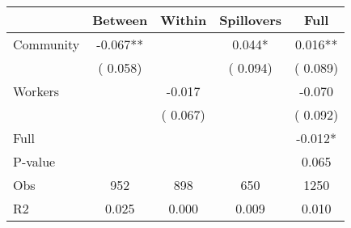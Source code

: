 
\begin{tabular}{l*{4}{c}}\hline&\multicolumn{1}{c}{Between}&\multicolumn{1}{c}{Within}&\multicolumn{1}{c}{Spillovers}&\multicolumn{1}{c}{Full}\\ \hline
 Community             &             -0.067**      &                                               &        0.044* &         0.016**                            \\ 
                               &        (       0.058)           &                                       &       (       0.094)     &      (       0.089)                                           \\ 
 Workers       &                                               &       -0.017    &                                &            -0.070                            \\ 
                               &                                               & (       0.067)                  &                                        &      (       0.092)                                           \\ 
\hline                                                                                                                                                                                                                                            
 Full                  &                                               &                                               &                                        &            -0.012*                                     \\ 
 P-value               &                                               &                                               &                                        &             0.065                                           \\ 
 Obs                   &               952               &       898                       &       650                &              1250                                               \\ 
 R2                    &                      0.025              &              0.000                      &              0.009               &                     0.010                                              \\ 
\hline \end{tabular}                                                                                                                                                                                                              